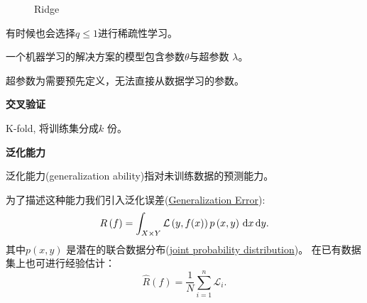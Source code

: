 \begin{figure}[ht]
    \centering
    \caption{Ridge}
    \label{fig:ridge}
\end{figure}
	有时候也会选择$q\le 1$进行稀疏性学习。

	一个机器学习的解决方案的模型包含参数$\theta$与超参数 $\lambda$。
	\begin{defi}
			超参数为需要预先定义，无法直接从数据学习的参数。
	\end{defi}


\noindent \textbf{交叉验证}

K-fold, 将训练集分成$k$ 份。

\noindent \textbf{泛化能力}
\begin{defi}
泛化能力(generalization ability)指对未训练数据的预测能力。
\end{defi}
为了描述这种能力我们引入泛化误差(\href{https://en.wikipedia.org/wiki/Generalization_error}{Generalization Error}): 
\[
		R\left( f \right) =\int _{X\times Y} \mathcal{L}\left( y,f(x) \right) p\left( x,y \right) \,\mathrm{d} x\,\mathrm{d} y
.\] 
其中$p(x,y)$ 是潜在的联合数据分布(\href{https://en.wikipedia.org/wiki/Joint_probability_distribution}{joint probability distribution})。
在已有数据集上也可进行经验估计：
\[
		\hat{R} \left( f \right) =\frac{1}{N} \sum_{i=1}^{n} \mathcal{L}_{i}
.\] 
